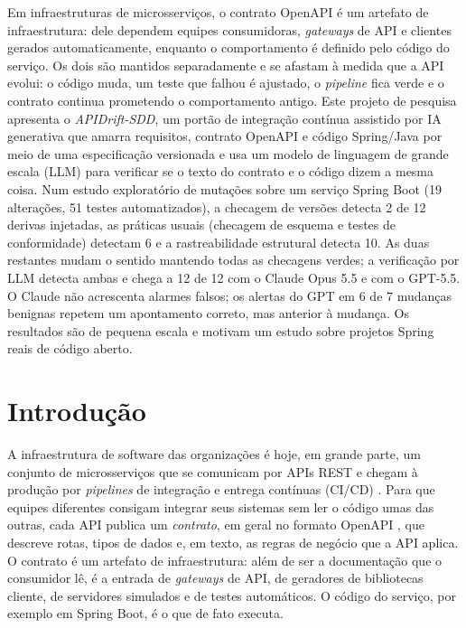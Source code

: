 \documentclass[12pt]{article}
\newcommand{\proj}{APIDrift-SDD}
\begin{document}
\begin{resumo}
Em infraestruturas de microsserviços, o contrato OpenAPI é um artefato de infraestrutura: dele dependem equipes consumidoras, \textit{gateways} de API e clientes gerados automaticamente, enquanto o comportamento é definido pelo código do serviço. Os dois são mantidos separadamente e se afastam à medida que a API evolui: o código muda, um teste que falhou é ajustado, o \textit{pipeline} fica verde e o contrato continua prometendo o comportamento antigo. Este projeto de pesquisa apresenta o \textit{\proj}, um portão de integração contínua assistido por IA generativa que amarra requisitos, contrato OpenAPI e código Spring/Java por meio de uma especificação versionada e usa um modelo de linguagem de grande escala (LLM) para verificar se o texto do contrato e o código dizem a mesma coisa. Num estudo exploratório de mutações sobre um serviço Spring Boot (19 alterações, 51 testes automatizados), a checagem de versões detecta 2 de 12 derivas injetadas, as práticas usuais (checagem de esquema e testes de conformidade) detectam 6 e a rastreabilidade estrutural detecta 10. As duas restantes mudam o sentido mantendo todas as checagens verdes; a verificação por LLM detecta ambas e chega a 12 de 12 com o Claude Opus 5.5 e com o GPT-5.5. O Claude não acrescenta alarmes falsos; os alertas do GPT em 6 de 7 mudanças benignas repetem um apontamento correto, mas anterior à mudança. Os resultados são de pequena escala e motivam um estudo sobre projetos Spring reais de código aberto.
\end{resumo}

\section{Introdu\c{c}\~ao}
\label{sec1:intro}

A infraestrutura de software das organizações é hoje, em grande parte, um conjunto de microsserviços que se comunicam por APIs REST \cite{dragoni2017microservices,fielding2000rest} e chegam à produção por \textit{pipelines} de integração e entrega contínuas (CI/CD) \cite{shahin2017cicd}. Para que equipes diferentes consigam integrar seus sistemas sem ler o código umas das outras, cada API publica um \textit{contrato}, em geral no formato OpenAPI \cite{openapi303}, que descreve rotas, tipos de dados e, em texto, as regras de negócio que a API aplica. O contrato é um artefato de infraestrutura: além de ser a documentação que o consumidor lê, é a entrada de \textit{gateways} de API, de geradores de bibliotecas cliente, de servidores simulados e de testes automáticos. O código do serviço, por exemplo em Spring Boot, é o que de fato executa.
\end{document}
